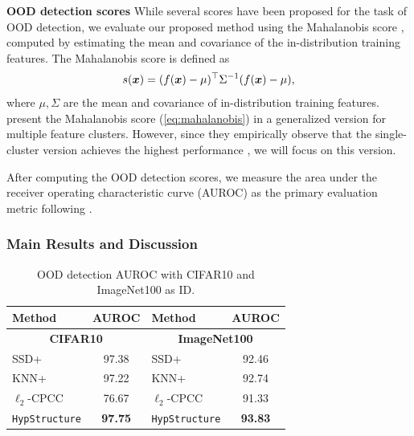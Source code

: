 \textbf{OOD detection scores}
While several scores have been proposed for the task of OOD detection, we evaluate our proposed method using the Mahalanobis score \citep{2021ssd}, computed by estimating the mean and covariance of the in-distribution training features. The Mahalanobis score is defined as
\begin{equation}
    s({\bm{x}}) = (f({\bm{x}}) - \mu)^\top\Sigma^{-1}(f({\bm{x}}) - \mu),
    \label{eq:mahalanobis}
\end{equation}
where $\mu, \Sigma$ are the mean and covariance of in-distribution training features. \citet{2021ssd} present the Mahalanobis score (\cref{eq:mahalanobis}) in a generalized version for multiple feature clusters. However, since they empirically observe that the single-cluster version achieves the highest performance \citep{2021ssd}, we will focus on this version.

After computing the OOD detection scores, we measure the area under the receiver operating characteristic curve (AUROC) as the primary evaluation metric following \citet{lee2018simple, 2021ssd}. 




\subsubsection{Main Results and Discussion}
\begin{table}[tb]
\centering
\caption{OOD detection AUROC with CIFAR10 and ImageNet100 as ID.}
\label{tab:ood_detection_cifar_imagenet}
\begin{tabular}{lc|lc}
    \toprule
    \textbf{Method} & \textbf{AUROC} & \textbf{Method} & \textbf{AUROC}\\
    \midrule
    \multicolumn{2}{c}{\textbf{CIFAR10}} & \multicolumn{2}{c}{\textbf{ImageNet100}} \\
    SSD+ & 97.38 & SSD+ & 92.46 \\
    KNN+ & 97.22 & KNN+ & 92.74 \\
    $\ell_2$-CPCC & 76.67 & $\ell_2$-CPCC & 91.33 \\
    \rowcolor{gray!20}\texttt{HypStructure} & \textbf{97.75} & \texttt{HypStructure} & \textbf{93.83}\\
    \bottomrule
\end{tabular}
\end{table}

